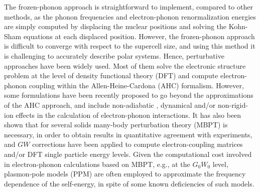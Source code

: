 \documentclass[journal=jctcce,manuscript=article]{achemso}
\begin{document}
The frozen-phonon approach is straightforward to implement, compared to other methods, as the phonon frequencies and electron-phonon renormalization energies are simply computed by displacing the nuclear positions and solving the Kohn-Sham equations at each displaced position\cite{antonius2014many,capaz2005frozenphonon,monserrat2014,monserrat2016correlation}. However, the frozen-phonon approach is difficult to converge with respect to the supercell size, \cite{baroni2001phonons,giustino2017electron} and using this method it is challenging to accurately describe polar systems\cite{ponce2015temperature_JCP,miglio2020nonadiabatic}. Hence, perturbative approaches have been widely used. Most of them  solve the electronic structure problem at the level of density functional theory (DFT)\cite{antonius2014many,cannuccia2011effect,cannuccia2012zero} and compute electron-phonon coupling within the Allen-Heine-Cardona (AHC) formalism\cite{allen1976theory,allen1981theory,giustino2010electron}. However, some formulations have been recently proposed to  go beyond the approximations of the AHC approach, and  include non-adiabatic
\cite{ponce2014temperature,ponce2015temperature_JCP,miglio2020nonadiabatic}, dynamical\cite{cannuccia2011effect,cannuccia2012zero,antonius2015dynamical} and/or non-rigid-ion\cite{ponce2014temperature} effects in the calculation of electron-phonon interactions. It has also been shown that for several solids many-body perturbation theory (MBPT)\cite{giustino2010electron,antonius2014many,monserrat2016correlation} is necessary, in order to obtain  results in quantitative agreement with experiments, and  $GW$ corrections have been applied to compute electron-coupling matrices\cite{li2019elph_berkeleygw,li2021unmasking} and/or DFT single particle energy levels\cite{giustino2010electron,antonius2014many,mcavoy2018coupling}. Given the computational cost involved in electron-phonon calculations based on MBPT, e.g., at the $G_0W_0$ level, plasmon-pole models (PPM) are often employed\cite{ppm1986,antonius2014many,monserrat2016correlation,li2019elph_berkeleygw,godby1988self} to approximate the frequency dependence of the self-energy, in spite of some known deficiencies of such models\cite{martin2016interacting}.   
\end{document}
